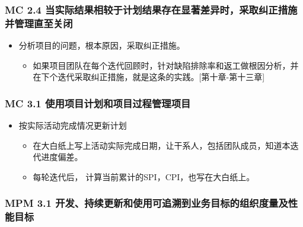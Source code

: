 \hypertarget{mc-2.4-ux5f53ux5b9eux9645ux7ed3ux679cux76f8ux8f83ux4e8eux8ba1ux5212ux7ed3ux679cux5b58ux5728ux663eux8457ux5deeux5f02ux65f6ux91c7ux53d6ux7ea0ux6b63ux63aaux65bdux5e76ux7ba1ux7406ux76f4ux81f3ux5173ux95ed}{%
\subsubsection{MC 2.4
当实际结果相较于计划结果存在显著差异时，采取纠正措施并管理直至关闭}\label{mc-2.4-ux5f53ux5b9eux9645ux7ed3ux679cux76f8ux8f83ux4e8eux8ba1ux5212ux7ed3ux679cux5b58ux5728ux663eux8457ux5deeux5f02ux65f6ux91c7ux53d6ux7ea0ux6b63ux63aaux65bdux5e76ux7ba1ux7406ux76f4ux81f3ux5173ux95ed}}

\begin{itemize}
\tightlist
\item
  分析项目的问题，根本原因，采取纠正措施。

  \begin{itemize}
  \tightlist
  \item
    如果项目团队在每个迭代回顾时，针对缺陷排除率和返工做根因分析，并在下个迭代采取纠正措施，就是这条的实践。{[}第十章-第十三章{]}
  \end{itemize}
\end{itemize}

\hypertarget{mc-3.1-ux4f7fux7528ux9879ux76eeux8ba1ux5212ux548cux9879ux76eeux8fc7ux7a0bux7ba1ux7406ux9879ux76ee}{%
\subsubsection{MC 3.1
使用项目计划和项目过程管理项目}\label{mc-3.1-ux4f7fux7528ux9879ux76eeux8ba1ux5212ux548cux9879ux76eeux8fc7ux7a0bux7ba1ux7406ux9879ux76ee}}

\begin{itemize}
\tightlist
\item
  按实际活动完成情况更新计划

  \begin{itemize}
  \tightlist
  \item
    在大白纸上写上活动实际完成日期，让干系人，包括团队成员，知道本迭代进度偏差。
  \item
    每轮迭代后， 计算当前累计的SPI，CPI，也写在大白纸上。
  \end{itemize}
\end{itemize}

\hypertarget{mpm-3.1-ux5f00ux53d1ux6301ux7eedux66f4ux65b0ux548cux4f7fux7528ux53efux8ffdux6eafux5230ux4e1aux52a1ux76eeux6807ux7684ux7ec4ux7ec7ux5ea6ux91cfux53caux6027ux80fdux76eeux6807}{%
\subsubsection{MPM 3.1
开发、持续更新和使用可追溯到业务目标的组织度量及性能目标}\label{mpm-3.1-ux5f00ux53d1ux6301ux7eedux66f4ux65b0ux548cux4f7fux7528ux53efux8ffdux6eafux5230ux4e1aux52a1ux76eeux6807ux7684ux7ec4ux7ec7ux5ea6ux91cfux53caux6027ux80fdux76eeux6807}}

